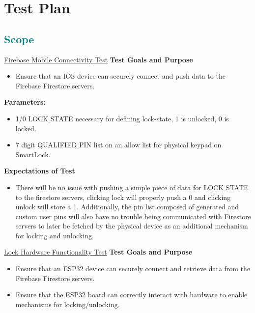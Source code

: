 \section{Test Plan}

\textcolor{teal}{\subsection{Scope}}
\underline{Firebase Mobile Connectivity Test}
\newline
\newline
\textbf{Test Goals and Purpose} 
\begin{itemize}
    
    \item Ensure that an IOS device can securely connect and push data to the Firebase Firestore servers.

\end{itemize}
\textbf{Parameters:}
\begin{itemize}

\item 1/0 LOCK$\_$STATE necessary for defining lock-state, 1 is unlocked, 0 is locked.
\item 7 digit QUALIFIED$\_$PIN list on an allow list for physical keypad on SmartLock.

\end{itemize}
\textbf{Expectations of Test}
\begin{itemize}

\item There will be no issue with pushing a simple piece of data for LOCK$\_$STATE to the firestore servers, clicking lock will properly push a 0 and clicking unlock will store a 1. Additionally, the pin list composed of generated and custom user pins will also have no trouble being communicated with Firestore servers to later be fetched by the physical device as an additional mechanism for locking and unlocking.

\end{itemize}
\underline{Lock Hardware Functionality Test}
\newline
\newline
\textbf{Test Goals and Purpose}
\begin{itemize}
    \item Ensure that an ESP32 device can securely connect and retrieve data from the Firebase Firestore servers.
    \item Ensure that the ESP32 board can correctly interact with hardware to enable mechanisms for locking/unlocking.
\end{itemize}
